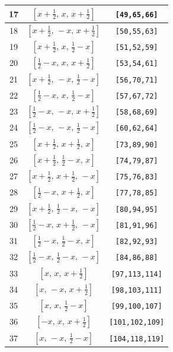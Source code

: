 \documentclass[fleqn,8pt]{jsarticle}
\begin{document}
\begin{longtable}{ccc}
17 & $\left[ x + \frac{1}{2},\, x,\, x + \frac{1}{2} \right]$ & {\tt [49,65,66]} \\ \hline
18 & $\left[ x + \frac{1}{2},\, - x,\, x + \frac{1}{2} \right]$ & {\tt [50,55,63]} \\ \hline
19 & $\left[ x + \frac{1}{2},\, x,\, \frac{1}{2} - x \right]$ & {\tt [51,52,59]} \\ \hline
20 & $\left[ \frac{1}{2} - x,\, x,\, x + \frac{1}{2} \right]$ & {\tt [53,54,61]} \\ \hline
21 & $\left[ x + \frac{1}{2},\, - x,\, \frac{1}{2} - x \right]$ & {\tt [56,70,71]} \\ \hline
22 & $\left[ \frac{1}{2} - x,\, x,\, \frac{1}{2} - x \right]$ & {\tt [57,67,72]} \\ \hline
23 & $\left[ \frac{1}{2} - x,\, - x,\, x + \frac{1}{2} \right]$ & {\tt [58,68,69]} \\ \hline
24 & $\left[ \frac{1}{2} - x,\, - x,\, \frac{1}{2} - x \right]$ & {\tt [60,62,64]} \\ \hline
25 & $\left[ x + \frac{1}{2},\, x + \frac{1}{2},\, x \right]$ & {\tt [73,89,90]} \\ \hline
26 & $\left[ x + \frac{1}{2},\, \frac{1}{2} - x,\, x \right]$ & {\tt [74,79,87]} \\ \hline
27 & $\left[ x + \frac{1}{2},\, x + \frac{1}{2},\, - x \right]$ & {\tt [75,76,83]} \\ \hline
28 & $\left[ \frac{1}{2} - x,\, x + \frac{1}{2},\, x \right]$ & {\tt [77,78,85]} \\ \hline
29 & $\left[ x + \frac{1}{2},\, \frac{1}{2} - x,\, - x \right]$ & {\tt [80,94,95]} \\ \hline
30 & $\left[ \frac{1}{2} - x,\, x + \frac{1}{2},\, - x \right]$ & {\tt [81,91,96]} \\ \hline
31 & $\left[ \frac{1}{2} - x,\, \frac{1}{2} - x,\, x \right]$ & {\tt [82,92,93]} \\ \hline
32 & $\left[ \frac{1}{2} - x,\, \frac{1}{2} - x,\, - x \right]$ & {\tt [84,86,88]} \\ \hline
33 & $\left[ x,\, x,\, x + \frac{1}{2} \right]$ & {\tt [97,113,114]} \\ \hline
34 & $\left[ x,\, - x,\, x + \frac{1}{2} \right]$ & {\tt [98,103,111]} \\ \hline
35 & $\left[ x,\, x,\, \frac{1}{2} - x \right]$ & {\tt [99,100,107]} \\ \hline
36 & $\left[ - x,\, x,\, x + \frac{1}{2} \right]$ & {\tt [101,102,109]} \\ \hline
37 & $\left[ x,\, - x,\, \frac{1}{2} - x \right]$ & {\tt [104,118,119]} \\ \hline

\end{longtable}
\end{document}
